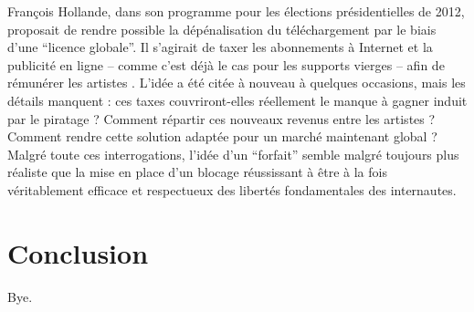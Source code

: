 \documentclass[a4paper]{report}
\begin{document}
	François Hollande, dans son programme pour les élections présidentielles de 2012, proposait de rendre possible la dépénalisation du téléchargement par le biais d'une ``licence globale''. Il s'agirait de taxer les abonnements à Internet et la publicité en ligne – comme c'est déjà le cas pour les supports vierges – afin de rémunérer les artistes \cite{licence-gloable}. L'idée a été citée à nouveau à quelques occasions, mais les détails manquent : ces taxes couvriront-elles réellement le manque à gagner induit par le piratage ? Comment répartir ces nouveaux revenus entre les artistes ? Comment rendre cette solution adaptée pour un marché maintenant global ?\\

	Malgré toute ces interrogations, l'idée d'un ``forfait'' semble malgré toujours plus réaliste que la mise en place d'un blocage réussissant à être à la fois véritablement efficace et respectueux des libertés fondamentales des internautes.





	\chapter{Conclusion}

	Bye.



	
	




\end{document}
